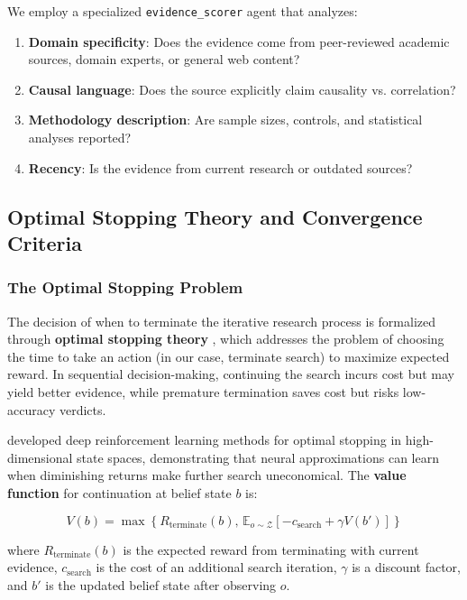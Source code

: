 We employ a specialized \texttt{evidence\_scorer} agent that analyzes:
\begin{enumerate}
    \item \textbf{Domain specificity}: Does the evidence come from peer-reviewed academic sources, domain experts, or general web content?
    \item \textbf{Causal language}: Does the source explicitly claim causality vs. correlation?
    \item \textbf{Methodology description}: Are sample sizes, controls, and statistical analyses reported?
    \item \textbf{Recency}: Is the evidence from current research or outdated sources?
\end{enumerate}

\subsection{Optimal Stopping Theory and Convergence Criteria}

\subsubsection{The Optimal Stopping Problem}

The decision of when to terminate the iterative research process is formalized through \textbf{optimal stopping theory} \citep{optimal_stopping_wiki, optimal_stopping_rl}, which addresses the problem of choosing the time to take an action (in our case, terminate search) to maximize expected reward. In sequential decision-making, continuing the search incurs cost but may yield better evidence, while premature termination saves cost but risks low-accuracy verdicts.

\citet{deep_rl_optimal_stopping} developed deep reinforcement learning methods for optimal stopping in high-dimensional state spaces, demonstrating that neural approximations can learn when diminishing returns make further search uneconomical. The \textbf{value function} for continuation at belief state $b$ is:

\begin{equation}
V(b) = \max \left\{ R_{\text{terminate}}(b), \, \mathbb{E}_{o \sim \mathcal{Z}} \left[ -c_{\text{search}} + \gamma V(b') \right] \right\}
\label{eq:optimal_stopping_value}
\end{equation}

where $R_{\text{terminate}}(b)$ is the expected reward from terminating with current evidence, $c_{\text{search}}$ is the cost of an additional search iteration, $\gamma$ is a discount factor, and $b'$ is the updated belief state after observing $o$.

